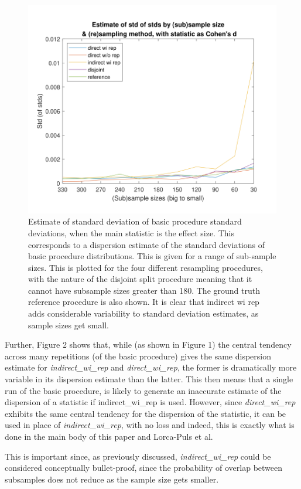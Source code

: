 \documentclass[
]{article}
\begin{document}
\begin{figure}
\includegraphics[width=0.7\linewidth]{figure2_sml} \caption{Estimate of standard deviation of basic procedure standard deviations, when the main statistic is the effect size. This corresponds to a dispersion estimate of the standard deviations of basic procedure distributions.  This is given for a range of sub-sample sizes. This is plotted for the four different resampling procedures, with the nature of the disjoint split procedure meaning that it cannot have subsample sizes greater than 180. The ground truth reference procedure is also shown. It is clear that indirect wi rep adds considerable variability to standard deviation estimates, as sample sizes get small.}\label{fig:FigureSDSDs}
\end{figure}

Further, Figure 2 shows that, while (as shown in Figure 1) the central
tendency across many repetitions (of the basic procedure) gives the same
dispersion estimate for \emph{indirect\_wi\_rep} and
\emph{direct\_wi\_rep}, the former is dramatically more variable in its
dispersion estimate than the latter. This then means that a single run
of the basic procedure, is likely to generate an inaccurate estimate of
the dispersion of a statistic if indirect\_wi\_rep is used. However,
since \emph{direct\_wi\_rep} exhibits the same central tendency for the
dispersion of the statistic, it can be used in place of
\emph{indirect\_wi\_rep}, with no loss and indeed, this is exactly what
is done in the main body of this paper and Lorca-Puls et al.~

This is important since, as previously discussed,
\emph{indirect\_wi\_rep} could be considered conceptually bullet-proof,
since the probability of overlap between subsamples does not reduce as
the sample size gets smaller.
\end{document}
